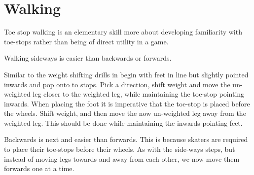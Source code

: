 \section{Walking}
\label{sec:toe_stop/walking}

Toe stop walking is an elementary skill more about developing familiarity with toe-stops rather than being of direct utility in a game.    


Walking sideways is easier than backwards or forwards. 

Similar to the weight shifting drills in  begin with feet in line but slightly pointed inwards and pop onto to stops.
Pick a direction, shift weight and move the un-weighted leg closer to the weighted leg, while maintaining the toe-stop pointing inwards.
When placing the foot it is imperative that the toe-stop is placed before the wheels.
Shift weight, and then move the now un-weighted leg away from the weighted leg. 
This should be done while maintaining the inwards pointing feet. 



Backwards is next and easier than forwards.
This is because skaters are required to place their toe-stops before their wheels.  
As with the side-ways steps, but instead of moving legs towards and away from each other, we now move them forwards one at a time.


